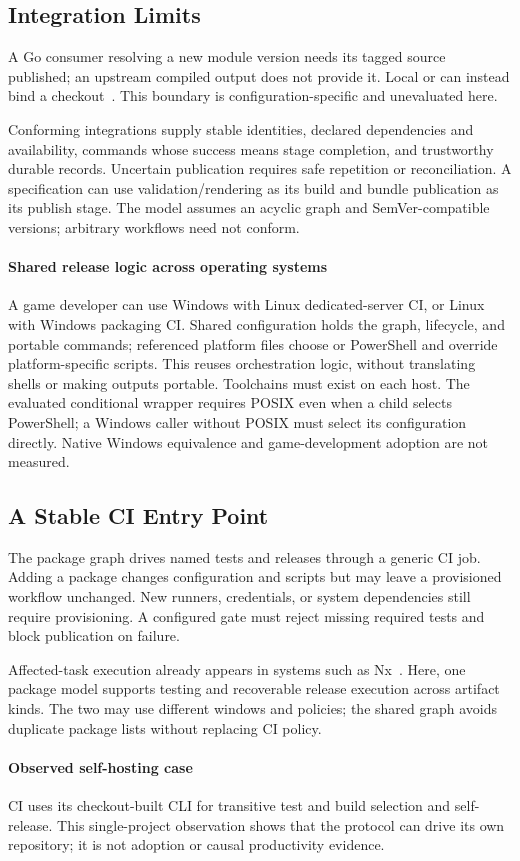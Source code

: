 \subsection{Integration Limits}

A Go consumer resolving a new module version needs its tagged source published;
an upstream compiled output does not provide it. Local  or
 can instead bind a checkout~\cite{gomod}. This boundary is
configuration-specific and unevaluated here.

Conforming integrations supply stable identities, declared dependencies and
availability, commands whose success means stage completion, and trustworthy
durable records. Uncertain publication requires safe repetition or
reconciliation. A specification can use validation/rendering as its build
and bundle publication as its publish stage. The model assumes an acyclic
graph and SemVer-compatible versions; arbitrary workflows need not conform.

\paragraph{Shared release logic across operating systems}
A game developer can use Windows with Linux dedicated-server CI, or Linux
with Windows packaging CI. Shared configuration holds the graph, lifecycle,
and portable commands; referenced platform files choose  or PowerShell
and override platform-specific scripts. This reuses orchestration logic,
without translating shells or making outputs portable. Toolchains must exist
on each host. The evaluated conditional wrapper requires POSIX even when a
child selects PowerShell; a Windows caller without POSIX must select its
configuration directly. Native Windows equivalence and game-development
adoption are not measured.

\subsection{A Stable CI Entry Point}
The package graph drives named tests and releases through a generic CI job.
Adding a package changes configuration and scripts but may leave a provisioned
workflow unchanged. New runners, credentials, or system dependencies still
require provisioning. A configured gate must reject missing required tests
and block publication on failure.

Affected-task execution already appears in systems such as Nx~\cite{nx}. Here,
one package model supports testing and recoverable release execution across
artifact kinds. The two may use different windows and policies; the shared
graph avoids duplicate package lists without replacing CI policy.

\paragraph{Observed self-hosting case}
CI uses its checkout-built CLI for transitive test and build selection and
self-release. This single-project observation shows that the protocol can drive
its own repository; it is not adoption or causal productivity evidence.
